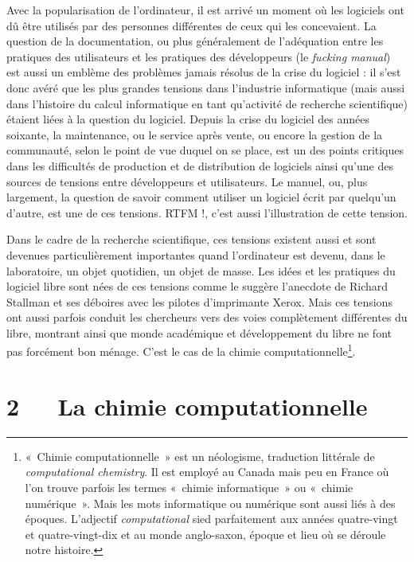 \documentclass{FramateX}
\begin{document}
\begin{refsection}
Avec la popularisation de l'ordinateur, il est arrivé
un moment où les logiciels ont dû être utilisés par des personnes
différentes de ceux qui les concevaient. La question de la
documentation, ou plus généralement de l'adéquation
entre les pratiques des utilisateurs et les pratiques des développeurs
(le \textit{fucking manual}) est aussi un emblème des problèmes
jamais résolus de la crise du logiciel : il s'est donc
avéré que les plus grandes tensions dans l'industrie
informatique (mais aussi dans l'histoire du calcul
informatique en tant qu'activité de recherche
scientifique) étaient liées à la question du logiciel. Depuis la crise
du logiciel des années soixante, la maintenance, ou le service après
vente, ou encore la gestion de la communauté, selon le point de vue
duquel on se place, est un des points critiques dans les difficultés de
production et de distribution de logiciels ainsi
qu'une des sources de tensions entre développeurs et
utilisateurs. Le manuel, ou, plus largement, la question de savoir
comment utiliser un logiciel écrit par quelqu'un
d'autre, est une de ces tensions. RTFM !,
c'est aussi l'illustration de cette
tension.

Dans le cadre de la recherche scientifique, ces tensions existent aussi
et sont devenues particulièrement importantes quand
l'ordinateur est devenu, dans le laboratoire, un objet
quotidien, un objet de masse. Les idées et les pratiques du logiciel
libre sont nées de ces tensions comme le suggère
l'anecdote de Richard Stallman et ses déboires avec
les pilotes d'imprimante Xerox. Mais ces tensions ont
aussi parfois conduit les chercheurs vers des voies complètement
différentes du libre, montrant ainsi que monde académique et
développement du libre ne font pas forcément bon ménage.
C'est le cas de la chimie
computationnelle\footnote{«~Chimie computationnelle~» est un
néologisme, traduction littérale de \textit{computational
chemistry}. Il est employé au Canada mais peu en France où
l'on trouve parfois les termes «~chimie informatique~»
ou «~chimie numérique~». Mais les mots informatique ou numérique sont
aussi liés à des époques. L'adjectif
\textit{computational} sied parfaitement aux
années quatre-vingt et quatre-vingt-dix et au monde anglo-saxon, époque
et lieu où se déroule notre histoire.}. 

\section*{2~~~La chimie computationnelle}
{}


\end{refsection}
\end{document}
